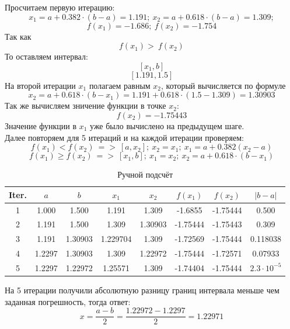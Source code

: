 \documentclass{article}
\begin{document}
Просчитаем первую итерацию: 
\[x_1 = a+0.382\cdot (b -a) =1.191;\ x_2 = a+0.618\cdot (b-a) = 1.309;\] 
\[f(x_1) = -1.686;\ f(x_2) = -1.754\]
Так как 
\[f(x_1) > \ f(x_2)\]
То оставляем интервал:
\[[x_1, b]\]
\[[1.191, 1.5]\]
На второй итерации $x_1$ полагаем равным $x_2$, который вычисляется по формуле 
\[x_2 = a + 0.618 \cdot (b - x_1) = 1.191 + 0.618\cdot (1.5 - 1.309) = 1.30903\]
Так же вычисляем зничение функции в точке $x_2$:
\[f(x_2) = -1.75443\]
Значение функции в $x_1$ уже было вычислено на предыдущем шаге.\\
Далее повторяем для 5 итераций и на каждой итерации проверяем: 
\[f(x_1)<f(x_2)\ =>\ [a, x_2];\ x_2 = x_1;\ x_1 = a+0.382(x_2-a)\]
\[f(x_1)\geq f(x_2)\ =>\ [x_1, b];\ x_1 = x_2;\ x_2 = a + 0.618 \cdot (b - x_1)\]
\begin{table}[H]
    \centering
    \begin{tabular}{|c|c|c|c|c|c|c|c|}
        \hline
        Iter. & $a$           & $b$               & $x_1$            & $x_2$            & $f(x_1)$                 & $f(x_2)$                 & $|b-a|$                  \\ \hline
        1     & 1.000         & 1.500             & 1.191            & 1.309            & -1.6855     & -1.75444     & 0.500                    \\
        2     & 1.191         & 1.500             & 1.309            & 1.30903 & -1.75444   & -1.75443     & 0.309                    \\
        3     & 1.191         & 1.30903 & 1.229704        & 1.309            & -1.72569      & -1.75444      & 0.118038      \\
        4     & 1.2297      & 1.30903 & 1.309            & 1.22972      & -1.75444      & -1.72571       & 0.07933     \\
        5     & 1.2297      & 1.22972        & 1.25571 & 1.309          & -1.74404      & -1.75444      & $2.3\cdot 10^{-5}$    \\ \hline
        \end{tabular}
    \caption{Ручной подсчёт}
    \label{tab:golden-section-search}
\end{table}
На 5 итерации получили абсолютную разницу границ интервала меньше чем заданная погрешность, тогда ответ:
\[x = \frac{a-b}{2} = \frac{1.22972 - 1.2297}{2} = 1.22971\]
\end{document}
